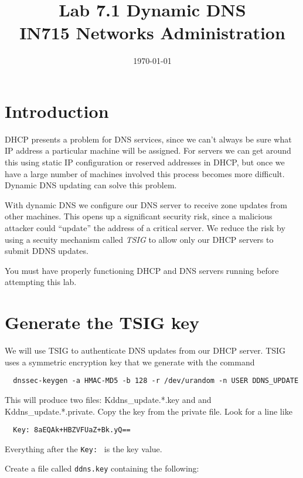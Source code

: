 \documentclass{article}
\begin{document}
\title{ Lab 7.1 Dynamic DNS\\ IN715 Networks Administration}
\date{\today}
\maketitle

\section*{Introduction}
DHCP presents a problem for DNS services, since we can't always be sure what IP address a particular
machine will be assigned.  For servers we can get around this using static IP configuration or 
reserved addresses in DHCP, but once we have a large number of machines involved this process becomes more difficult.  Dynamic DNS updating can solve this problem.

With dynamic DNS we configure our DNS server to receive zone updates from other machines.  This opens up 
a significant security risk, since a malicious attacker could ``update'' the address of a critical 
server. We reduce the risk by using a secuity mechanism called \emph{TSIG} to allow only
our DHCP servers to submit DDNS updates.  

You must have properly functioning DHCP and DNS servers running before attempting this lab.



\section{Generate the TSIG key}
We will use TSIG to authenticate DNS updates from our DHCP server.  TSIG uses a symmetric encryption key that we generate with the command

\begin{verbatim}
  dnssec-keygen -a HMAC-MD5 -b 128 -r /dev/urandom -n USER DDNS_UPDATE
\end{verbatim}

This will produce two files: Kddns\_update.*.key and and Kddns\_update.*.private.  Copy the key from the
private file.  Look for a line like 

\begin{verbatim}
  Key: 8aEQAk+HBZVFUaZ+Bk.yQ==
\end{verbatim}

Everything after the \texttt{Key: } is the key value.

Create a file called \texttt{ddns.key} containing the following:
\end{document}
